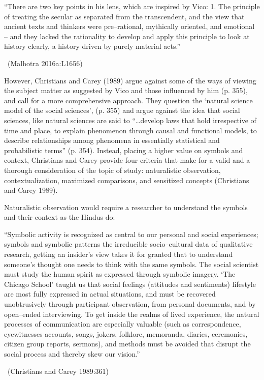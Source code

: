 \begin{myquote}
“There are two key points in his lens, which are inspired by Vico: 1. The principle of treating the secular as separated from the transcendent, and the view that ancient texts and thinkers were pre–rational, mythically oriented, and emotional – and they lacked the rationality to develop and apply this principle to look at history clearly, a history driven by purely material acts.” 

~\hfill (Malhotra 2016a:L1656)
\end{myquote}

However, Christians and Carey (1989) argue against some of the ways of viewing the subject matter as suggested by Vico and those influenced by him (p. 355), and call for a more comprehensive approach. They question the ‘natural science model of the social sciences’, (p. 355) and argue against the idea that social sciences, like natural sciences are said to “…develop laws that hold irrespective of time and place, to explain phenomenon through causal and functional models, to describe relationships among phenomena in essentially statistical and probabilistic terms” (p. 354). Instead, placing a higher value on symbols and context, Christians and Carey provide four criteria that make for a valid and a thorough consideration of the topic of study: naturalistic observation, contextualization, maximized comparisons, and sensitized concepts (Christians and Carey 1989).

Naturalistic observation would require a researcher to understand the symbols and their context as the Hindus do:

\begin{myquote}
“Symbolic activity is recognized as central to our personal and social experiences; symbols and symbolic patterns the irreducible socio–cultural data of qualitative research, getting an insider’s view takes it for granted that to understand someone’s thought one needs to think with the same symbols. The social scientist must study the human spirit as expressed through symbolic imagery. ‘The Chicago School’ taught us that social feelings (attitudes and sentiments) lifestyle are most fully expressed in actual situations, and must be recovered unobtrusively through participant observation, from personal documents, and by open–ended interviewing. To get inside the realms of lived experience, the natural processes of communication are especially valuable (such as correspondence, eyewitnesses accounts, songs, jokers, folklore, memoranda, diaries, ceremonies, citizen group reports, sermons), and methods must be avoided that disrupt the social process and thereby skew our vision.” 

~\hfill (Christians and Carey 1989:361)
\end{myquote}

